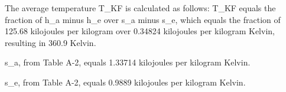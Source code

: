 The average temperature T_KF is calculated as follows:
T_KF equals the fraction of h_a minus h_e over s_a minus s_e, which equals the fraction of 125.68 kilojoules per kilogram over 0.34824 kilojoules per kilogram Kelvin, resulting in 360.9 Kelvin.

s_a, from Table A-2, equals 1.33714 kilojoules per kilogram Kelvin.

s_e, from Table A-2, equals 0.9889 kilojoules per kilogram Kelvin.